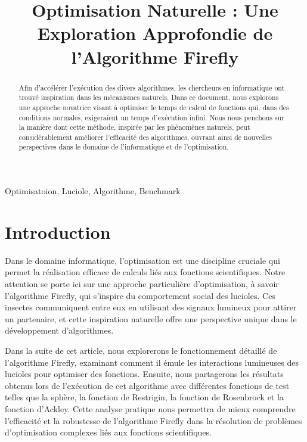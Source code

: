 \documentclass[conference]{IEEEtran}
\begin{document}
\title{ Optimisation Naturelle : Une Exploration Approfondie de l'Algorithme Firefly\\
}

\author{
}

\maketitle

\begin{abstract}
Afin d'accélérer l'exécution des divers algorithmes, les chercheurs en informatique ont trouvé inspiration dans les mécanismes naturels. Dans ce document, nous explorons une approche novatrice visant à optimiser le temps de calcul de fonctions qui, dans des conditions normales, exigeraient un temps d'exécution infini. Nous nous penchons sur la manière dont cette méthode, inspirée par les phénomènes naturels, peut considérablement améliorer l'efficacité des algorithmes, ouvrant ainsi de nouvelles perspectives dans le domaine de l'informatique et de l'optimisation.
\end{abstract}

\begin{IEEEkeywords}
Optimisatoion, Luciole, Algorithme, Benchmark
\end{IEEEkeywords}

\section{Introduction}

Dans le domaine informatique, l'optimisation est une discipline cruciale qui permet la réalisation efficace de calculs liés aux fonctions scientifiques. Notre attention se porte ici sur une approche particulière d'optimisation, à savoir l'algorithme Firefly, qui s'inspire du comportement social des lucioles. Ces insectes communiquent entre eux en utilisant des signaux lumineux pour attirer un partenaire, et cette inspiration naturelle offre une perspective unique dans le développement d'algorithmes.

Dans la suite de cet article, nous explorerons le fonctionnement détaillé de l'algorithme Firefly, examinant comment il émule les interactions lumineuses des lucioles pour optimiser des fonctions. Ensuite, nous partagerons les résultats obtenus lors de l'exécution de cet algorithme avec différentes fonctions de test telles que la sphère, la fonction de Restrigin, la fonction de Rosenbrock et la fonction d'Ackley. Cette analyse pratique nous permettra de mieux comprendre l'efficacité et la robustesse de l'algorithme Firefly dans la résolution de problèmes d'optimisation complexes liés aux fonctions scientifiques.
\end{document}
